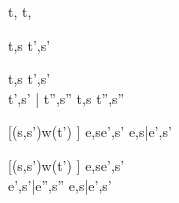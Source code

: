 




  { }
  {t,\Sigma {} t,\Sigma}





  {t,s  t',s'}


  {t,s    t',s' \\
   t',s' \bar{\normalise} t'',s''}
  {t,s  t'',s''}


[\Delta(s,s')\cap w(t') \equiv \emptyset]
    {e,s\normalise e',s'}
    {e,s\bar{\normalise}e',s'}

[\Delta(s,s')\cap w(t') \neq \emptyset]
    {e,s\normalise e',s'\\
    e',s'\bar{\normalise}e'',s''}
    {e,s\bar{\normalise}e',s'}
